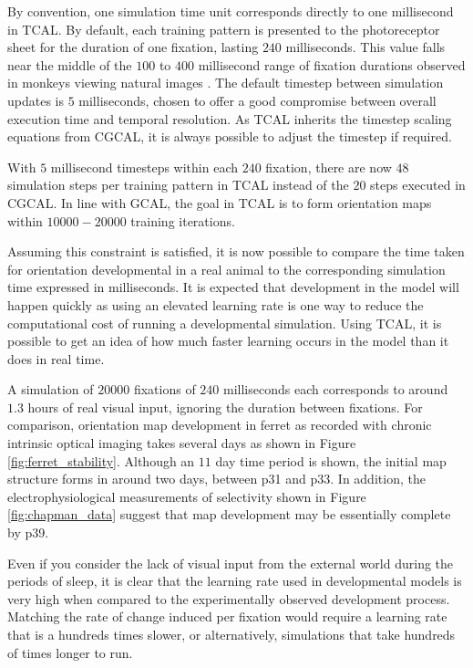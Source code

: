 \documentclass[phd,ianc,twoside]{infthesis}
\begin{document}
By convention, one simulation time unit corresponds directly to one
millisecond in TCAL. By default, each training pattern is presented to
the photoreceptor sheet for the duration of one fixation, lasting $240$
milliseconds. This value falls near the middle of the $100$ to $400$
millisecond range of fixation durations observed in monkeys viewing
natural images \citep{gallant_neuroreport98}. The default timestep
between simulation updates is $5$ milliseconds, chosen to offer a good
compromise between overall execution time and temporal resolution. As
TCAL inherits the timestep scaling equations from CGCAL, it is always
possible to adjust the timestep if required.

With $5$ millisecond timesteps within each $240$ fixation, there are now
$48$ simulation steps per training pattern in TCAL instead of the $20$
steps executed in CGCAL. In line with GCAL, the goal in TCAL is to form
orientation maps within $10000-20000$ training iterations.

Assuming this constraint is satisfied, it is now possible to compare the
time taken for orientation developmental in a real animal to the
corresponding simulation time expressed in milliseconds. It is expected
that development in the model will happen quickly as using an elevated
learning rate is one way to reduce the computational cost of running a
developmental simulation. Using TCAL, it is possible to get an idea of
how much faster learning occurs in the model than it does in real time.

A simulation of $20000$ fixations of $240$ milliseconds each corresponds
to around $1.3$ hours of real visual input, ignoring the duration
between fixations. For comparison, orientation map development in ferret
as recorded with chronic intrinsic optical imaging takes several days as
shown in Figure \ref{fig:ferret_stability}. Although an $11$ day time
period is shown, the initial map structure forms in around two days,
between p31 and p33. In addition, the electrophysiological measurements
of selectivity shown in Figure \ref{fig:chapman_data} suggest that map
development may be essentially complete by p39.

Even if you consider the lack of visual input from the external world
during the periods of sleep, it is clear that the learning rate used in
developmental models is very high when compared to the experimentally
observed development process. Matching the rate of change induced per
fixation would require a learning rate that is a hundreds times slower,
or alternatively, simulations that take hundreds of times longer to run.
\end{document}
